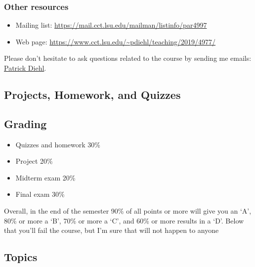 \documentclass[11pt,letterpaper]{article}
\begin{document}
\subsubsection*{Other resources}

\begin{itemize}
\item Mailing list: \url{https://mail.cct.lsu.edu/mailman/listinfo/par4997}
\item Web page: \url{https://www.cct.lsu.edu/~pdiehl/teaching/2019/4977/}
\end{itemize}

Please don’t hesitate to ask questions related to the course by sending me emails: \href{mailto:patrickdiehl@lsu.edu}{Patrick Diehl}. 

\subsection*{Projects, Homework, and Quizzes}

\subsection*{Grading}
\begin{itemize}
\item Quizzes and homework 30\%
\item Project 20\%
\item Midterm exam 20\%
\item Final exam 30\%
\end{itemize}
Overall, in the end of the semester 90\% of all points or more will give you an ‘A’, 80\% or more a ‘B’, 70\% or more a ‘C’, and 60\% or more results in a ‘D’. Below that you’ll fail the course, but I’m sure that will not happen to anyone

\subsection*{Topics}
\end{document}

